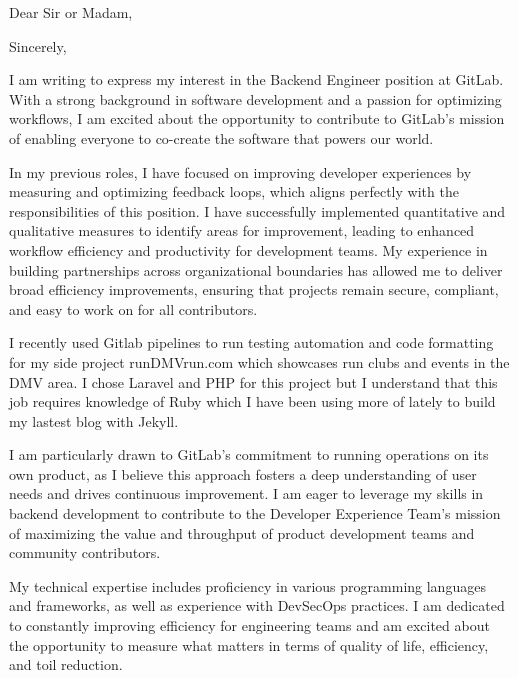 \documentclass{my_cv}
\begin{document}
\newcommand{\companyName}{GitLab } %
\newcommand{\jobTitle}{Backend Engineer }
  \recipient{\companyName \ Recruitment }{}
\date{\today}
\opening{Dear Sir or Madam,}
\closing{Sincerely,}
\makelettertitle

I am writing to express my interest in the Backend Engineer position at GitLab. With a strong background in software development and a passion for optimizing workflows, I am excited about the opportunity to contribute to GitLab’s mission of enabling everyone to co-create the software that powers our world.

In my previous roles, I have focused on improving developer experiences by measuring and optimizing feedback loops, which aligns perfectly with the responsibilities of this position. I have successfully implemented quantitative and qualitative measures to identify areas for improvement, leading to enhanced workflow efficiency and productivity for development teams. My experience in building partnerships across organizational boundaries has allowed me to deliver broad efficiency improvements, ensuring that projects remain secure, compliant, and easy to work on for all contributors.  

I recently used Gitlab pipelines to run testing automation and code formatting for my side project runDMVrun.com which showcases run clubs and events in the DMV area.  I chose Laravel and PHP for this project but I understand that this job requires knowledge of Ruby which I have been using more of lately to build my lastest blog with Jekyll.

I am particularly drawn to GitLab’s commitment to running operations on its own product, as I believe this approach fosters a deep understanding of user needs and drives continuous improvement. I am eager to leverage my skills in backend development to contribute to the Developer Experience Team’s mission of maximizing the value and throughput of product development teams and community contributors.

My technical expertise includes proficiency in various programming languages and frameworks, as well as experience with DevSecOps practices. I am dedicated to constantly improving efficiency for engineering teams and am excited about the opportunity to measure what matters in terms of quality of life, efficiency, and toil reduction.
\end{document}
